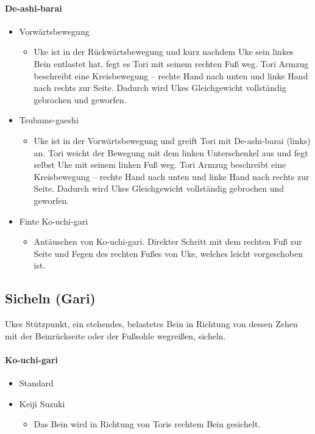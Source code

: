 \documentclass[justified, a4paper, notitlepage, captions=tableheading, nobib]{tufte-handout}
\begin{document}
\paragraph{De-ashi-barai }
\label{sec:org315ebc3}
\begin{itemize}
\item Vorwärtsbewegung
\begin{itemize}
\item Uke ist in der Rückwärtsbewegung und kurz nachdem Uke sein linkes Bein entlastet hat, fegt es Tori mit seinem rechten Fuß weg. Tori Armzug beschreibt eine Kreisbewegung – rechte Hand nach unten und linke Hand nach rechts zur Seite. Dadurch wird Ukes Gleichgewicht vollständig gebrochen und geworfen.
\end{itemize}
\item Tsubame-gaeshi
\begin{itemize}
\item Uke ist in der Vorwärtsbewegung und greift Tori mit De-ashi-barai (links) an. Tori weicht der Bewegung mit dem linken Unterschenkel aus und fegt selbst Uke mit seinem linken Fuß weg. Tori Armzug beschreibt eine Kreisbewegung – rechte Hand nach unten und linke Hand nach rechts zur Seite. Dadurch wird Ukes Gleichgewicht vollständig gebrochen und geworfen.
\end{itemize}
\item Finte Ko-uchi-gari
\begin{itemize}
\item Antäuschen von Ko-uchi-gari. Direkter Schritt mit dem rechten Fuß zur Seite und Fegen des rechten Fußes von Uke, welches leicht vorgeschoben ist.
\end{itemize}
\end{itemize}

\subsection{Sicheln (Gari) }
\label{sec:org3a1bb4a}
Ukes Stützpunkt, ein stehendes, belastetes Bein in Richtung von dessen Zehen mit der Beinrückseite oder der Fußsohle wegreißen, sicheln.

\paragraph{Ko-uchi-gari }
\label{sec:org5fc1d34}
\begin{itemize}
\item Standard
\item Keiji Suzuki
\begin{itemize}
\item Das Bein wird in Richtung von Toris rechtem Bein gesichelt.
\end{itemize}
\end{itemize}
\end{document}
